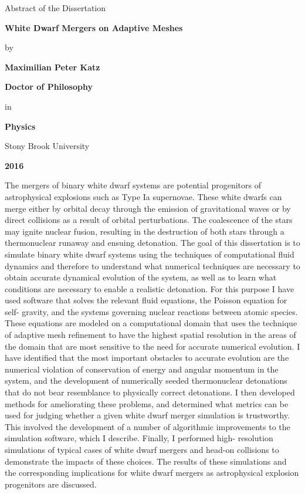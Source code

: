 \documentclass[12pt]{article}
\begin{document}
\centerline{Abstract of the Dissertation}
\vspace*{1\baselineskip}
\centerline{\bf{White Dwarf Mergers on Adaptive Meshes}}
\vspace*{1\baselineskip}
\centerline{by}
\vspace*{1\baselineskip}
\centerline{\bf{Maximilian Peter Katz}}
\vspace*{1\baselineskip}
\centerline{\bf{Doctor of Philosophy}}
\vspace*{1\baselineskip}
\centerline{in}
\vspace*{1\baselineskip}
\centerline{\bf{Physics}}
\vspace*{1\baselineskip}
\centerline{Stony Brook University}
\vspace*{1\baselineskip}
\centerline{\bf{2016}}
\vspace*{2\baselineskip}
The mergers of binary white dwarf systems are potential progenitors of astrophysical
explosions such as Type Ia supernovae. These white dwarfs can merge either by orbital
decay through the emission of gravitational waves or by direct collisions as a result of
orbital perturbations. The coalescence of the stars may ignite nuclear fusion, resulting in
the destruction of both stars through a thermonuclear runaway and ensuing detonation.
The goal of this dissertation is to simulate binary white dwarf systems using the
techniques of computational fluid dynamics and therefore to understand what numerical
techniques are necessary to obtain accurate dynamical evolution of the system, as well as
to learn what conditions are necessary to enable a realistic detonation. For this purpose I
have used software that solves the relevant fluid equations, the Poisson equation for self-
gravity, and the systems governing nuclear reactions between atomic species. These
equations are modeled on a computational domain that uses the technique of adaptive
mesh refinement to have the highest spatial resolution in the areas of the domain that are
most sensitive to the need for accurate numerical evolution. I have identified that the
most important obstacles to accurate evolution are the numerical violation of
conservation of energy and angular momentum in the system, and the development of
numerically seeded thermonuclear detonations that do not bear resemblance to physically
correct detonations. I then developed methods for ameliorating these problems, and
determined what metrics can be used for judging whether a given white dwarf merger
simulation is trustworthy. This involved the development of a number of algorithmic
improvements to the simulation software, which I describe. Finally, I performed high-
resolution simulations of typical cases of white dwarf mergers and head-on collisions to
demonstrate the impacts of these choices. The results of these simulations and the
corresponding implications for white dwarf mergers as astrophysical explosion
progenitors are discussed.
\end{document}
